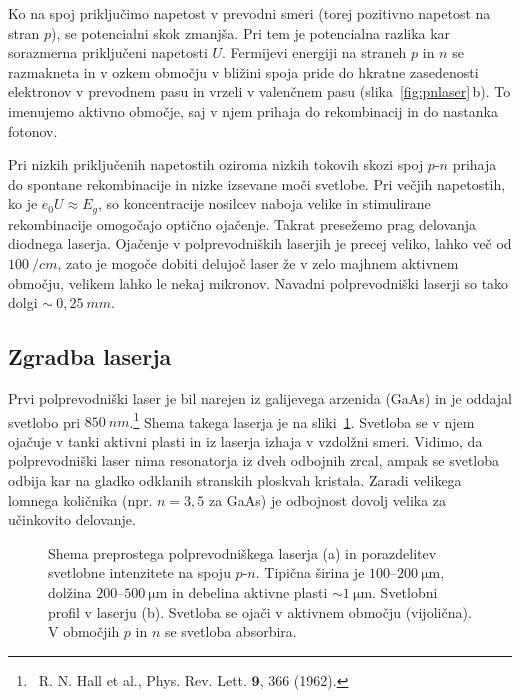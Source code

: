 Ko na spoj priključimo napetost v prevodni smeri (torej pozitivno napetost na stran
$p$), se potencialni skok zmanjša. Pri tem je potencialna razlika kar sorazmerna priključeni
napetosti $U$. Fermijevi energiji na straneh $p$ in $n$ se razmakneta in v
ozkem območju v bližini spoja pride do hkratne zasedenosti elektronov
v prevodnem pasu in vrzeli v valenčnem pasu (slika~\ref{fig:pnlaser}\,b). 
To imenujemo aktivno območje, saj v njem prihaja do rekombinacij in do nastanka fotonov. 

Pri nizkih 
priključenih napetostih oziroma nizkih tokovih skozi spoj $p$-$n$ prihaja
do spontane rekombinacije in nizke izsevane moči svetlobe. 
Pri večjih napetostih, ko je $e_0U \approx E_g$, so koncentracije nosilcev naboja velike in
stimulirane rekombinacije omogočajo optično ojačenje. Takrat presežemo prag delovanja
diodnega laserja. 
Ojačenje v polprevodniških laserjih je precej veliko, lahko več od 
$100~/\si{cm}$, zato je mogoče dobiti delujoč laser že v zelo majhnem aktivnem 
območju, velikem lahko le nekaj mikronov. Navadni polprevodniški laserji so tako 
dolgi $\sim~0,25~\si{mm}$.

\subsection*{Zgradba laserja}
Prvi polprevodniški laser je bil narejen iz galijevega arzenida (GaAs) in je oddajal svetlobo 
pri $850~\si{nm}$.\footnote{~R. N. Hall 
et al., Phys. Rev. Lett. $\mathbf{9}$, 366 (1962).} 
Shema takega laserja je na sliki~\ref{fig:pnshema}. Svetloba se v njem ojačuje
v tanki aktivni plasti in iz laserja izhaja v vzdolžni smeri. 
Vidimo, da polprevodniški laser nima resonatorja iz dveh odbojnih zrcal,
ampak se svetloba odbija kar na gladko odklanih stranskih ploskvah kristala. Zaradi
velikega lomnega količnika (npr. $n=3,5$ za GaAs) je odbojnost dovolj velika
za učinkovito delovanje.
\begin{figure}[ht]
\centering
\def\svgwidth{140truemm} 

\caption{Shema preprostega polprevodniškega laserja (a) in porazdelitev svetlobne
intenzitete na spoju $p$-$n$. Tipična širina je $100$--$200~\si{\micro\metre}$, 
dolžina $200$--$500~\si{\micro\metre}$ in debelina aktivne plasti  $\sim 1~\si{\micro\metre}$. 
Svetlobni profil v laserju (b). Svetloba 
se ojači v aktivnem območju (vijolična). V območjih $p$ in $n$ se svetloba absorbira.
}
\label{fig:pnshema}
\end{figure}

